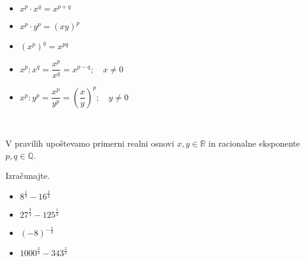                         \begin{itemize}
                            \item $\displaystyle x^p\cdot x^q=x^{p+q}$
                            \item $\displaystyle x^p\cdot y^p=(xy)^p$
                            \item $\displaystyle \left(x^p\right)^q=x^{pq}$
                        \end{itemize}
                        \begin{itemize}
                            \item $\displaystyle x^p:x^q=\dfrac{x^p}{x^q}=x^{p-q}; \quad x\neq 0$
                            \item $\displaystyle x^p:y^p=\dfrac{x^p}{y^p}=\left(\dfrac{x}{y}\right)^p; \quad y\neq 0$
                        \end{itemize}
                
                ~

                V pravilih upoštevamo primerni realni osnovi $x,y\in\mathbb{R}$ in racionalne eksponente $p,q\in\mathbb{Q}$.




            \begin{naloga}
                Izračunajte.
                \begin{itemize}
                    \item $\displaystyle 8^\frac{1}{3}-16^\frac{2}{4}$ 
                    \item $\displaystyle 27^\frac{2}{3}-125^\frac{1}{3}$ 
                    \item $\displaystyle \left(-8\right)^{-\frac{1}{3}}$ 
                    \item $\displaystyle 1000^\frac{2}{3}-343^\frac{2}{3}$ 
                \end{itemize}
            \end{naloga}

